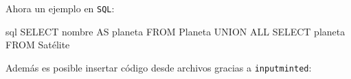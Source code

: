 Ahora un ejemplo en \texttt{SQL}: \\

\begin{codecaption}
    \begin{mintedcode}{sql}
        SELECT nombre AS planeta
        FROM Planeta
        UNION ALL
        SELECT planeta
        FROM Satélite  
    \end{mintedcode}
\caption{Ejemplo de consulta en SQL}
\end{codecaption}

Además es posible insertar código desde archivos gracias a \texttt{inputminted}: \\

\begin{codecaption}
    \begin{inputcode}
        \inputminted{c}{src/code/helloworld.c}
    \end{inputcode}
\caption{Ejemplo de Hello World! en C}
\end{codecaption}